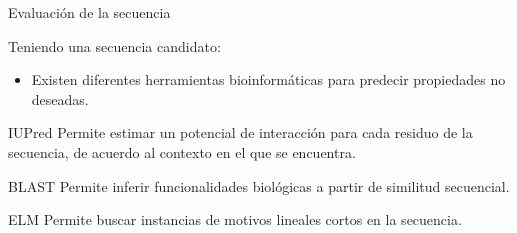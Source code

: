 \documentclass{beamer}
\begin{document}
\begin{frame}{Evaluación de la secuencia}

Teniendo una secuencia candidato:\\
\begin{itemize}
 \item Existen diferentes herramientas bioinformáticas para predecir propiedades no deseadas. %
\end{itemize}

% 
 
\pause
\begin{block}{IUPred}
Permite estimar un potencial de interacción para cada residuo de la secuencia, de acuerdo al contexto en el que se encuentra.
\end{block}
% 
% 

\pause
\begin{block}{BLAST}
 Permite inferir funcionalidades biológicas a partir de similitud secuencial.
\end{block}
\pause
\begin{block}{ELM}
 Permite buscar instancias de motivos lineales cortos en la secuencia.
\end{block}

\end{frame}
\end{document}
